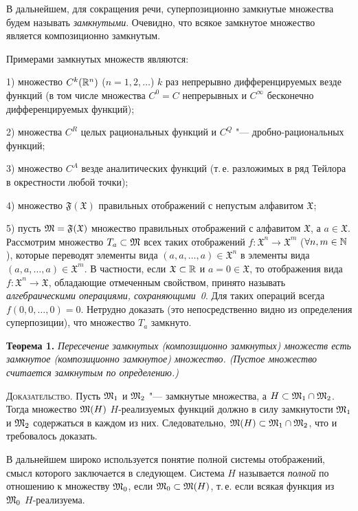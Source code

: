 В дальнейшем, для сокращения речи, суперпозиционно замкнутые множества
будем называть \emph{замкнутыми}. Очевидно, что всякое замкнутое множество
является композиционно замкнутым.

Примерами замкнутых множеств являются:

1) множество $C^k(\mathbb R^n)$ ($n=1,2,\dots$) $k$ раз непрерывно
дифференцируемых везде функций (в том числе множества $C^0=C$ непрерывных
и $C^\infty$ бесконечно дифференцируемых функций);

2) множества $C^R$ целых рациональных функций и $C^Q$ "---
дробно-рациональных функций;

3) множество $C^A$ везде аналитических функций (т.\,е. разложимых в ряд
Тейлора в окрестности любой точки);

4) множество $\mathfrak F(\mathfrak X)$ правильных отображений с непустым
алфавитом $\mathfrak X$;

5) пусть $\mathfrak M=\mathfrak F(\mathfrak X)$ множество правильных отображений
с алфавитом $\mathfrak X$, а $a\in\mathfrak X$. Рассмотрим множество
$T_a\subset\mathfrak M$ всех таких отображений
$f\colon\mathfrak X^n\to\mathfrak X^m$ ($\forall n,m\in\mathbb N$), которые
переводят элементы вида $(a,a,\dots,a)\in\mathfrak X^n$ в элементы вида
$(a,a,\dots,a)\in\mathfrak X^m$. В частности, если $\mathfrak X\subset\mathbb R$
и $a=0\in\mathfrak X$, то отображения вида $f\colon\mathfrak X^n\to\mathfrak X$,
обладающие отмеченным свойством, принято называть \emph{алгебраическими
операциями, сохраняющими~0}. Для таких операций всегда $f(0,0,\dots,0)=0$.
Нетрудно доказать (это непосредственно видно из определения суперпозиции),
что множество $T_a$ замкнуто.

\textbf{Теорема 1.} \emph{Пересечение замкнутых (композиционно
замкнутых) множеств есть замкнутое (композиционно замкнутое) множество.
(Пустое множество считается замкнутым по определению.)}

\textsc{Доказательство.} Пусть $\mathfrak M_1$ и $\mathfrak M_2$ "--- замкнутые множества,
а $H\subset\mathfrak M_1\cap\mathfrak M_2$. Тогда множество $\mathfrak M(H)$ $H$-реализуемых функций
должно в силу замкнутости $\mathfrak M_1$ и $\mathfrak M_2$ содержаться в каждом из них.
Следовательно, $\mathfrak M(H)\subset\mathfrak M_1\cap\mathfrak M_2$, что и требовалось доказать.

В дальнейшем широко используется понятие полной системы отображений, смысл
которого заключается в следующем. Система $H$ называется \emph{полной} по
отношению к множеству $\mathfrak M_0$, если $\mathfrak M_0\subset\mathfrak M(H)$, т.\,е. если всякая
функция из $\mathfrak M_0$ $H$-реализуема.

